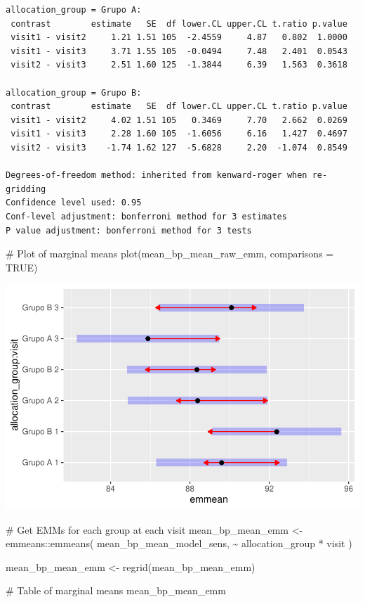\documentclass[
  letterpaper,
  DIV=11,
  numbers=noendperiod]{scrartcl}
\newenvironment{Shaded}{\begin{snugshade}}{\end{snugshade}}
\newcommand{\AttributeTok}[1]{\textcolor[rgb]{0.40,0.45,0.13}{#1}}
\newcommand{\CommentTok}[1]{\textcolor[rgb]{0.37,0.37,0.37}{#1}}
\newcommand{\ConstantTok}[1]{\textcolor[rgb]{0.56,0.35,0.01}{#1}}
\newcommand{\FunctionTok}[1]{\textcolor[rgb]{0.28,0.35,0.67}{#1}}
\newcommand{\NormalTok}[1]{\textcolor[rgb]{0.00,0.23,0.31}{#1}}
\newcommand{\OtherTok}[1]{\textcolor[rgb]{0.00,0.23,0.31}{#1}}
\newcommand{\SpecialCharTok}[1]{\textcolor[rgb]{0.37,0.37,0.37}{#1}}
\begin{document}
\begin{verbatim}
allocation_group = Grupo A:
 contrast        estimate   SE  df lower.CL upper.CL t.ratio p.value
 visit1 - visit2     1.21 1.51 105  -2.4559     4.87   0.802  1.0000
 visit1 - visit3     3.71 1.55 105  -0.0494     7.48   2.401  0.0543
 visit2 - visit3     2.51 1.60 125  -1.3844     6.39   1.563  0.3618

allocation_group = Grupo B:
 contrast        estimate   SE  df lower.CL upper.CL t.ratio p.value
 visit1 - visit2     4.02 1.51 105   0.3469     7.70   2.662  0.0269
 visit1 - visit3     2.28 1.60 105  -1.6056     6.16   1.427  0.4697
 visit2 - visit3    -1.74 1.62 127  -5.6828     2.20  -1.074  0.8549

Degrees-of-freedom method: inherited from kenward-roger when re-gridding 
Confidence level used: 0.95 
Conf-level adjustment: bonferroni method for 3 estimates 
P value adjustment: bonferroni method for 3 tests 
\end{verbatim}

\begin{Shaded}
\begin{Highlighting}[]
\CommentTok{\# Plot of marginal means}
\FunctionTok{plot}\NormalTok{(mean\_bp\_mean\_raw\_emm, }\AttributeTok{comparisons =} \ConstantTok{TRUE}\NormalTok{)}
\end{Highlighting}
\end{Shaded}

\includegraphics{Outcomes_V1V2V3_files/figure-pdf/mean_bp_mean_raw_emm-1.pdf}

\begin{Shaded}
\begin{Highlighting}[]
\CommentTok{\# Get EMMs for each group at each visit}
\NormalTok{mean\_bp\_mean\_emm }\OtherTok{\textless{}{-}}\NormalTok{ emmeans}\SpecialCharTok{::}\FunctionTok{emmeans}\NormalTok{(}
\NormalTok{    mean\_bp\_mean\_model\_sens, }
    \SpecialCharTok{\textasciitilde{}}\NormalTok{ allocation\_group }\SpecialCharTok{*}\NormalTok{ visit}
\NormalTok{)}

\NormalTok{mean\_bp\_mean\_emm }\OtherTok{\textless{}{-}} \FunctionTok{regrid}\NormalTok{(mean\_bp\_mean\_emm)}

\CommentTok{\# Table of marginal means}
\NormalTok{mean\_bp\_mean\_emm}
\end{Highlighting}
\end{Shaded}
\end{document}
